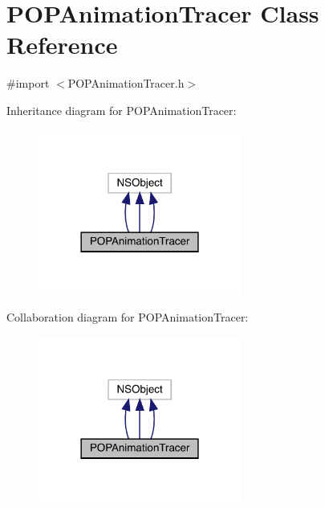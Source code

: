 \hypertarget{interface_p_o_p_animation_tracer}{}\section{P\+O\+P\+Animation\+Tracer Class Reference}
\label{interface_p_o_p_animation_tracer}


{\ttfamily \#import $<$P\+O\+P\+Animation\+Tracer.\+h$>$}



Inheritance diagram for P\+O\+P\+Animation\+Tracer\+:\nopagebreak
\begin{figure}[H]
\begin{center}
\leavevmode
\includegraphics[width=189pt]{interface_p_o_p_animation_tracer__inherit__graph}
\end{center}
\end{figure}


Collaboration diagram for P\+O\+P\+Animation\+Tracer\+:\nopagebreak
\begin{figure}[H]
\begin{center}
\leavevmode
\includegraphics[width=189pt]{interface_p_o_p_animation_tracer__coll__graph}
\end{center}
\end{figure}
